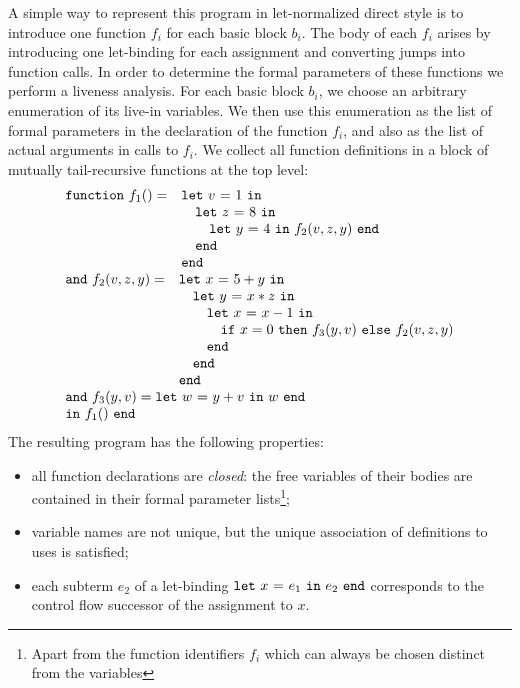 A simple way to represent this program in let-normalized direct style
is to introduce one function $f_i$ for each basic block $b_i$. The
body of each $f_i$ arises by introducing one let-binding for each
assignment and converting jumps into function calls. In order to
determine the formal parameters of these functions we perform a
liveness analysis. For each basic block $b_i$, we choose an arbitrary
enumeration of its live-in variables. We then use this enumeration as
the list of formal parameters in the declaration of the function
$f_i$, and also as the list of actual arguments in calls to $f_i$. We
collect all function definitions in a block of mutually tail-recursive
functions at the top level:
\begin{equation}
\label{FunctionalConstructionProgram1}
\begin{array}{l}
  \begin{array}{ll}
    \mathtt{function}\ f_1() = 
     & \mathtt{let}\ {v}\ \mathtt{=}\ {1}\ \mathtt{in}\ {}\ \\
     & \quad \mathtt{let}\ {z}\ \mathtt{=}\ {8}\ \mathtt{in}\ {}\ \\
     & \quad \quad \mathtt{let}\ {y}\ \mathtt{=}\ {4}\ \mathtt{in}\ {{f_2}\mathtt{(}{v,z,y}\mathtt{)}}\ \mathtt{end}\\
     & \quad \mathtt{end}\\
     & \mathtt{end}
  \end{array}\\
  \begin{array}{ll}
    \mathtt{and}\ f_2(v,z,y) =
     & \mathtt{let}\ {x}\ \mathtt{=}\ {5+y}\ \mathtt{in}\ {}\ \\
     & \quad \mathtt{let}\ {y}\ \mathtt{=}\ {x*z}\ \mathtt{in}\ {}\ \\
     & \quad \quad \mathtt{let}\ {x}\ \mathtt{=}\ {x-1}\ \mathtt{in}\ {}\ \\
     & \quad \quad \quad {\ensuremath{\mathtt{if}\ {x=0}\ \mathtt{then}\ {{f_3}\mathtt{(}{y,v}\mathtt{)}}\ \mathtt{else}\ {{f_2}\mathtt{(}{v,z,y}\mathtt{)}}}}\\
     & \quad \quad \mathtt{end}\\
     & \quad \mathtt{end}\\
     & \mathtt{end}
  \end{array}\\
  \begin{array}{l}
    \mathtt{and}\ f_3(y,v) = \mathtt{let}\ {w}\ \mathtt{=}\ {y+v}\ \mathtt{in}\ {w}\ \mathtt{end}\\
    \mathtt{in}\ f_1()\ \mathtt{end}
  \end{array} 
\end{array}
\end{equation}
The resulting program has the following properties:
\begin{itemize}
\item 
  all function declarations are \emph{closed}: the free variables of
  their bodies are contained in their formal parameter
  lists\footnote{Apart from the function identifiers $f_i$ which can
  always be chosen distinct from the variables};

\item
  variable names are not unique, but the unique association of
  definitions to uses is satisfied;

\item
  each subterm $e_2$ of a let-binding $\mathtt{let}\ {x}\ \mathtt{=}\ {e_1}\ \mathtt{in}\ {e_2}\ \mathtt{end}$
  corresponds to the control flow successor of the assignment to $x$.

\end{itemize}
